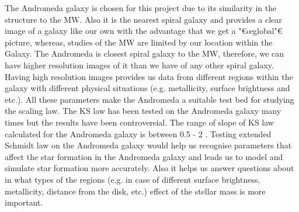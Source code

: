 The Andromeda galaxy is chosen for this project due to its similarity in the structure to the MW. Also it is the nearest spiral galaxy and provides a clear image of a galaxy like our own with the advantage that we get a "€œglobal"€ picture, whereas, studies of the MW are limited by our location within the Galaxy.  The Andromeda is closest spiral galaxy to the MW, therefore, we can have higher resolution images of it than we have of any other spiral galaxy. Having high resolution images provides us data from different regions within the galaxy with different physical situations (e.g. metallicity, surface brightness and etc.). All these parameters make the Andromeda a suitable test bed for studying the scaling law. The KS law has been tested on the Andromeda galaxy many times but the results have been controversial. The range of slope of KS law calculated for the Andromeda galaxy is between 0.5 - 2 \citep[e.g.,][]{Tabatabaei10, Ford13}. Testing extended Schmidt law on the Andromeda galaxy would help us recognise parameters that affect the star formation in the Andromeda galaxy and leads us to model and simulate star formation more accurately. Also it helps us answer questions about in what types of the regions (e.g. in case of different surface brightness, metallicity, distance from the disk, etc.) effect of the stellar mass is more important.